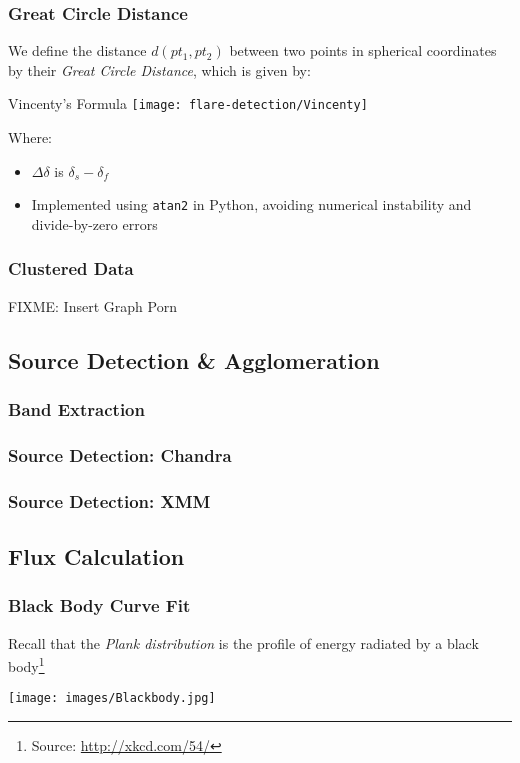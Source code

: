 \begin{frame}
\frametitle{Great Circle Distance}
	We define the distance $d(pt_1,pt_2)$ between two points in spherical coordinates by their \emph{Great Circle Distance}, which is given by:
\begin{block}{Vincenty's Formula}
\texttt{[image: flare-detection/Vincenty]}
\end{block}
Where:
\begin{itemize}
\item $\Delta \delta$ is $\delta_s-\delta_f$
\item Implemented using \texttt{atan2} in Python, avoiding numerical instability and divide-by-zero errors
\end{itemize}
\end{frame}
\begin{frame}
\frametitle{Clustered Data}
FIXME: Insert Graph Porn
\end{frame}
\subsection{Source Detection \& Agglomeration}
\begin{frame}
\frametitle{Band Extraction}
\end{frame}
\begin{frame}
\frametitle{Source Detection: Chandra}
\end{frame}
\begin{frame}
\frametitle{Source Detection: XMM}
\end{frame}
\subsection{Flux Calculation}
\begin{frame}
\frametitle{Black Body Curve Fit}
Recall that the \emph{Plank distribution} is the profile of energy radiated by a black body\footnote{Source: \url{http://xkcd.com/54/}}
\begin{center}
\texttt{[image: images/Blackbody.jpg]}
\end{center}
\end{frame}
